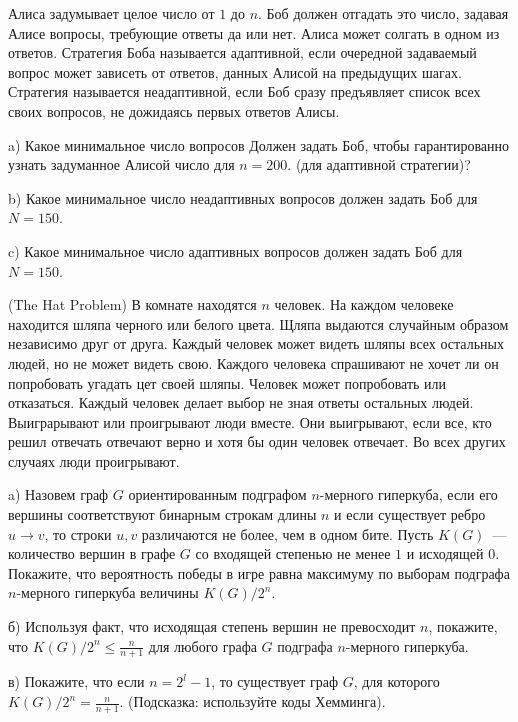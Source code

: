 \setcounter{curtask}{51}


\begin{task}
	Алиса задумывает целое число от $1$ до $n$. Боб должен отгадать это число,
    задавая Алисе вопросы, требующие ответы да или нет. Алиса может солгать в одном
    из ответов. Стратегия Боба называется адаптивной, если очередной задаваемый
    вопрос может зависеть от ответов, данных Алисой на предыдущих шагах. Стратегия
    называется неадаптивной, если Боб сразу предъявляет список всех своих вопросов,
    не дожидаясь первых ответов Алисы.

	a) Какое минимальное число вопросов Должен задать Боб, чтобы гарантированно
    узнать задуманное Алисой число для $n = 200$. (для адаптивной стратегии)?
    
	b) Какое минимальное число неадаптивных вопросов должен задать Боб для $N = 150$.
    
	c) Какое минимальное число адаптивных вопросов должен задать Боб для $N = 150$.
\end{task}

\begin{task} (The Hat Problem)
    В комнате находятся $n$ человек. На каждом человеке находится шляпа черного или
    белого цвета. Щляпа выдаются случайным образом независимо друг от друга. Каждый
    человек может видеть шляпы всех остальных людей, но не может видеть свою. Каждого
    человека спрашивают не хочет ли он попробовать угадать цет своей шляпы. Человек
    может попробовать или отказаться. Каждый человек делает выбор не зная ответы
    остальных людей. Выиграрывают или проигрывают люди вместе. Они выигрывают, если
    все, кто решил отвечать отвечают верно и хотя бы один человек отвечает. Во всех
    других случаях люди проигрывают.

	a) Назовем граф $G$ ориентированным подграфом $n$-мерного гиперкуба, если его
    вершины соответствуют бинарным строкам длины $n$ и если существует ребро $u
    \rightarrow v$, то строки $u, v$ различаются не более, чем в одном бите. Пусть
    $K(G)$~--- количество вершин в графе $G$ со входящей степенью не менее $1$ и
    исходящей $0$. Покажите, что вероятность победы в игре равна максимуму по выборам
    подграфа $n$-мерного гиперкуба величины $K(G) / 2^n$.

    б) Используя факт, что исходящая степень вершин не превосходит $n$, покажите, что
    $K(G) / 2^n \le \frac{n}{n + 1}$ для любого графа $G$ подграфа $n$-мерного
    гиперкуба.

    в) Покажите, что если $n = 2^l - 1$, то существует граф $G$, для которого
	$K(G) / 2^n = \frac{n}{n + 1}$. (Подсказка: используйте коды Хемминга).
\end{task}

